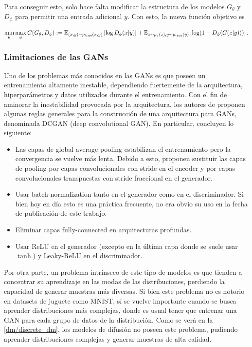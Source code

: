 Para conseguir esto, solo hace falta modificar la estructura de los modelos $G_\theta$ y $D_\phi$ para permitir una entrada adicional $y$. Con esto, la nueva función objetivo es

\begin{equation*}
    \min_\theta\max_\phi C(G_\theta, D_\phi) := \mathbb{E}_{(x,y)\sim p_{\operatorname{true}}(x,y)}\left[\log D_\phi(x|y)\right] + \mathbb{E}_{z\sim p_z(z),y\sim p_{\operatorname{true}}(y)}\left[\log (1-D_\phi(G(z|y)))\right].
\end{equation*}

\subsubsection{Limitaciones de las GANs}

Uno de los problemas más conocidos en las GANs es que poseen un entrenamiento altamente inestable, dependiendo fuertemente de la arquitectura, hiperparámetros y datos utilizados durante el entrenamiento. Con el fin de aminorar la inestabilidad provocada por la arquitectura, los autores de \cite{radford2016unsupervised} proponen algunas reglas generales para la construcción de una arquitectura para GANs, denominada DCGAN (deep convolutional GAN). En particular, concluyen lo siguiente:

\begin{itemize}
    \item Las capas de global average pooling estabilizan el entrenamiento pero la convergencia se vuelve más lenta. Debido a esto, proponen sustituir las capas de pooling por capas convolucionales con stride en el encoder y por capas convolucionales transpuestas con stride fraccional en el generador.
    \item Usar batch normalization \cite{ioffe2015batch} tanto en el generador como en el discriminador. Si bien hoy en día esto es una práctica frecuente, no era obvio su uso en la fecha de publicación de este trabajo.
    \item Eliminar capas fully-connected en arquitecturas profundas.
    \item Usar ReLU en el generador (excepto en la última capa donde se suele usar $\tanh$) y Leaky-ReLU en el discriminador.
\end{itemize}

Por otra parte, un problema intrínseco de este tipo de modelos es que tienden a concentrar su aprendizaje en las modas de las distribuciones, perdiendo la capacidad de generar muestras más diversas. Si bien este problema no es notorio en datasets de juguete como MNIST, sí se vuelve importante cuando se busca aprender distribuciones más complejas, donde es usual tener que entrenar una GAN para cada grupo de datos de la distribución. Como se verá en la \autoref{dm/discrete_dm}, los modelos de difusión no poseen este problema, pudiendo aprender distribuciones complejas y generar muestras de alta calidad.

